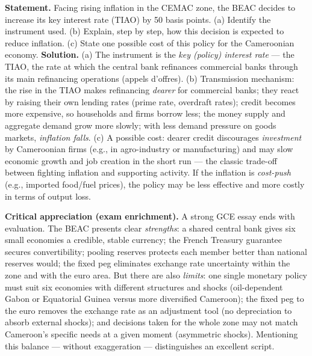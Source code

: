 \documentclass[11pt]{article}
\begin{document}
\begin{exoresolu}
\textbf{Statement.} Facing rising inflation in the CEMAC zone, the BEAC decides to increase its key interest rate (TIAO) by 50 basis points. (a) Identify the instrument used. (b) Explain, step by step, how this decision is expected to reduce inflation. (c) State one possible cost of this policy for the Cameroonian economy.
\tcblower
\textbf{Solution.} (a) The instrument is the \emph{key (policy) interest rate} — the TIAO, the rate at which the central bank refinances commercial banks through its main refinancing operations (appels d'offres). (b) Transmission mechanism: the rise in the TIAO makes refinancing \emph{dearer} for commercial banks; they react by raising their own lending rates (prime rate, overdraft rates); credit becomes more expensive, so households and firms borrow less; the money supply and aggregate demand grow more slowly; with less demand pressure on goods markets, \emph{inflation falls}. (c) A possible cost: dearer credit discourages \emph{investment} by Cameroonian firms (e.g., in agro-industry or manufacturing) and may slow economic growth and job creation in the short run — the classic trade-off between fighting inflation and supporting activity. If the inflation is \emph{cost-push} (e.g., imported food/fuel prices), the policy may be less effective and more costly in terms of output loss.
\end{exoresolu}

\textbf{Critical appreciation (exam enrichment).} A strong GCE essay ends with evaluation. The BEAC presents clear \emph{strengths}: a shared central bank gives six small economies a credible, stable currency; the French Treasury guarantee secures convertibility; pooling reserves protects each member better than national reserves would; the fixed peg eliminates exchange rate uncertainty within the zone and with the euro area. But there are also \emph{limits}: one single monetary policy must suit six economies with different structures and shocks (oil-dependent Gabon or Equatorial Guinea versus more diversified Cameroon); the fixed peg to the euro removes the exchange rate as an adjustment tool (no depreciation to absorb external shocks); and decisions taken for the whole zone may not match Cameroon's specific needs at a given moment (asymmetric shocks). Mentioning this balance — without exaggeration — distinguishes an excellent script.
\end{document}

